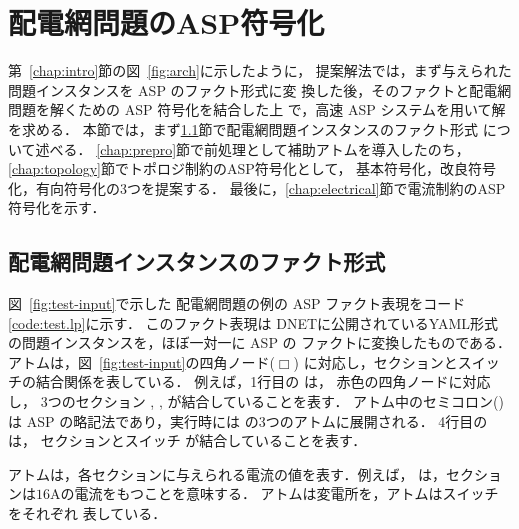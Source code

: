 ﻿\section{配電網問題のASP符号化}\label{chap:encode}

第~\ref{chap:intro}節の図~\ref{fig:arch}に示したように，
提案解法では，まず与えられた問題インスタンスを ASP のファクト形式に変
換した後，そのファクトと配電網問題を解くための ASP 符号化を結合した上
で，高速 ASP システム{\clingo}を用いて解を求める．
%
本節では，まず\ref{chap:fact}節で配電網問題インスタンスのファクト形式
について述べる．
\ref{chap:prepro}節で前処理として補助アトムを導入したのち，
\ref{chap:topology}節でトポロジ制約のASP符号化として，
基本符号化，改良符号化，有向符号化の3つを提案する．
最後に，\ref{chap:electrical}節で電流制約のASP符号化を示す．

\subsection{配電網問題インスタンスのファクト形式}\label{chap:fact}



図~\ref{fig:test-input}で示した
配電網問題の例の ASP ファクト表現をコード\ref{code:test.lp}に示す．
このファクト表現は
DNETに公開されているYAML形式の問題インスタンスを，ほぼ一対一に ASP の
ファクトに変換したものである．
%
アトムは，図~\ref{fig:test-input}の四角ノード($\Box$)
に対応し，セクションとスイッチの結合関係を表している．
例えば，1行目の
は，
赤色の四角ノードに対応し，
3つのセクション
, , 
が結合していることを表す．
アトム中のセミコロン(\code{;})は ASP の略記法であり，実行時には
の3つのアトムに展開される．
%
4行目のは，
セクションとスイッチ
が結合していることを表す．

アトムは，各セクションに与えられる電流の値を表す．例えば，
は，セクションは$16$Aの電流をもつことを意味する．
%
アトムは変電所を，アトムはスイッチをそれぞれ
表している．


